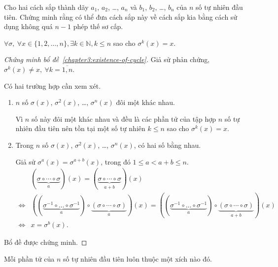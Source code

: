 \documentclass[class=linear-algebra,crop=false]{standalone}
\begin{document}
\begin{exercise}
	Cho hai cách sắp thành dãy $a_{1}$, $a_{2}$, \ldots, $a_{n}$ và $b_{1}$, $b_{2}$, \ldots, $b_{n}$ của $n$ số tự nhiên đầu tiên. Chứng minh rằng có thể đưa cách sắp này về cách sắp kia bằng cách sử dụng không quá $n-1$ phép thế sơ cấp.
\end{exercise}

\begin{lemma}\label{chapter3:fixed-point}
	$\forall\sigma,\ \forall x\in\{ 1,2,\ldots,n \}, \exists k\in\mathbb{N}, k\le n$ sao cho $\sigma^{k}(x) = x$.
\end{lemma}

\begin{proof}[Chứng minh bổ đề~\ref{chapter3:existence-of-cycle}]
	\par Giả sử phản chứng, $\sigma^{k}(x)\ne x,\ \forall k=\overline{1,n}$.
	\par Có hai trường hợp cần xem xét.
	\begin{enumerate}[label = Trường hợp \arabic*:,itemindent=2cm]
		\item $n$ số $\sigma(x)$, $\sigma^{2}(x)$, \ldots, $\sigma^{n}(x)$ đôi một khác nhau.
		      \par Vì $n$ số này đôi một khác nhau và đều là các phần tử của tập hợp $n$ số tự nhiên đầu tiên nên tồn tại một số tự nhiên $k\le n$ sao cho $\sigma^{k}(x) = x$.
		\item Trong $n$ số $\sigma(x)$, $\sigma^{2}(x)$, \ldots, $\sigma^{n}(x)$, có hai số bằng nhau.
		      \par Giả sử $\sigma^{a}(x) = \sigma^{a+b}(x)$, trong đó $1\le a < a + b\le n$.
		      \[
			      \begin{split}
				      &(\underbrace{\sigma\circ\cdots\circ\sigma}_{a})(x) = (\underbrace{\sigma\circ\cdots\circ\sigma}_{a+b})(x) \\
				      \Leftrightarrow& ((\underbrace{\sigma^{-1}\circ\ldots\circ\sigma^{-1}}_{a})\circ\underbrace{(\sigma\circ\cdots\circ\sigma)}_{a})(x) = ((\underbrace{\sigma^{-1}\circ\ldots\circ\sigma^{-1}}_{a})\circ\underbrace{(\sigma\circ\cdots\circ\sigma)}_{a+b})(x) \\
				      \Leftrightarrow& x = \sigma^{b}(x).
			      \end{split}
		      \]
	\end{enumerate}
	\par Bổ đề được chứng minh.
\end{proof}

\begin{lemma}\label{chapter3:existence-of-cycle}
	Mỗi phần tử của $n$ số tự nhiên đầu tiên luôn thuộc một xích nào đó.
\end{lemma}
\end{document}

